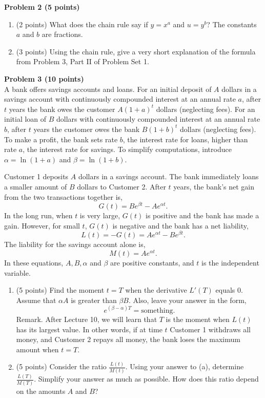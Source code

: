 \documentclass{article}
\begin{document}
\textbf{Problem 2 (5 points)} 
\begin{enumerate}[label=(\alph*)]
    \item (2 points) What does the chain rule say if \( y = x^a \) and \( u = y^b \)? The constants \( a \) and \( b \) are fractions.
    \item (3 points) Using the chain rule, give a very short explanation of the formula from Problem 3, Part II of Problem Set 1.
\end{enumerate}

\textbf{Problem 3 (10 points)} \\
A bank offers savings accounts and loans. For an initial deposit of \( A \) dollars in a savings account with continuously compounded interest at an annual rate \( a \), after \( t \) years the bank owes the customer \( A(1 + a)^t \) dollars (neglecting fees). For an initial loan of \( B \) dollars with continuously compounded interest at an annual rate \( b \), after \( t \) years the customer owes the bank \( B(1 + b)^t \) dollars (neglecting fees). To make a profit, the bank sets rate \( b \), the interest rate for loans, higher than rate \( a \), the interest rate for savings. To simplify computations, introduce \( \alpha = \ln(1 + a) \) and \( \beta = \ln(1 + b) \).

Customer 1 deposits \( A \) dollars in a savings account. The bank immediately loans a smaller amount of \( B \) dollars to Customer 2. After \( t \) years, the bank’s net gain from the two transactions together is, 
\[
G(t) = Be^{\beta t} - Ae^{\alpha t}. \tag{1}
\]
In the long run, when \( t \) is very large, \( G(t) \) is positive and the bank has made a gain. However, for small \( t \), \( G(t) \) is negative and the bank has a net liability, 
\[
L(t) = -G(t) = Ae^{\alpha t} - Be^{\beta t}. \tag{2}
\]
The liability for the savings account alone is, 
\[
M(t) = Ae^{\alpha t}. \tag{3}
\]
In these equations, \( A, B, \alpha \) and \( \beta \) are positive constants, and \( t \) is the independent variable.

\begin{enumerate}[label=(\alph*)]
    \item (5 points) Find the moment \( t = T \) when the derivative \( L'(T) \) equals 0. Assume that \( \alpha A \) is greater than \( \beta B \). Also, leave your answer in the form, 
    \[
    e^{(\beta - \alpha)T} = \text{something.}
    \]
    Remark. After Lecture 10, we will learn that \( T \) is the moment when \( L(t) \) has its largest value. In other words, if at time \( t \) Customer 1 withdraws all money, and Customer 2 repays all money, the bank loses the maximum amount when \( t = T \).

    \item (5 points) Consider the ratio \( \frac{L(t)}{M(t)} \). Using your answer to (a), determine \( \frac{L(T)}{M(T)} \). Simplify your answer as much as possible. How does this ratio depend on the amounts \( A \) and \( B \)?
\end{enumerate}
\end{document}
